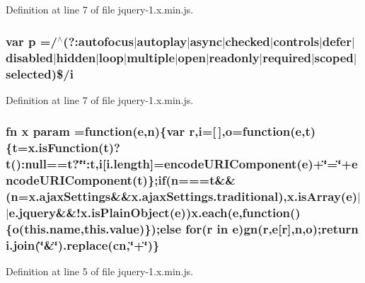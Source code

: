 Definition at line 7 of file jquery-\/1.\+x.\+min.\+js.

\subsubsection[{\texorpdfstring{p}{p}}]{\setlength{\rightskip}{0pt plus 5cm}var p =/$^\wedge$(?\+:autofocus$\vert$autoplay$\vert$async$\vert$checked$\vert$controls$\vert$defer$\vert$disabled$\vert${\bf hidden}$\vert$loop$\vert$multiple$\vert$open$\vert$readonly$\vert$required$\vert$scoped$\vert$selected)\$/{\bf i}}\hypertarget{jquery-1_8x_8min_8js_ad1707b001240e9c8298830073364c8bf}{}\label{jquery-1_8x_8min_8js_ad1707b001240e9c8298830073364c8bf}


Definition at line 7 of file jquery-\/1.\+x.\+min.\+js.

\subsubsection[{\texorpdfstring{param}{param}}]{ {\bf fn} {\bf x} param =function({\bf e},{\bf n})\{var r,{\bf i}=\mbox{[}$\,$\mbox{]},{\bf o}=function({\bf e},{\bf t})\{{\bf t}=x.\+is\+Function({\bf t})?{\bf t}()\+:{\bf null}=={\bf t}?\char`\"{}\char`\"{}\+:{\bf t},{\bf i}\mbox{[}{\bf i.\+length}\mbox{]}=encode\+U\+R\+I\+Component({\bf e})+\char`\"{}=\char`\"{}+encode\+U\+R\+I\+Component({\bf t})\};{\bf if}({\bf n}==={\bf t}\&\&({\bf n}=x.\+ajax\+Settings\&\&x.\+ajax\+Settings.\+traditional),x.\+is\+Array({\bf e})$\vert$$\vert$e.\+jquery\&\&!x.\+is\+Plain\+Object({\bf e})){\bf x.\+each}({\bf e},function()\{{\bf o}({\bf this.\+name},{\bf this.\+value})\});{\bf else} {\bf for}(r in {\bf e}){\bf gn}(r,{\bf e}\mbox{[}r\mbox{]},{\bf n},{\bf o});return i.\+join(\char`\"{}\&\char`\"{}).replace({\bf cn},\char`\"{}+\char`\"{})\}}\hypertarget{jquery-1_8x_8min_8js_ae8915303d11557d1b001bc56b6195251}{}\label{jquery-1_8x_8min_8js_ae8915303d11557d1b001bc56b6195251}


Definition at line 5 of file jquery-\/1.\+x.\+min.\+js.


